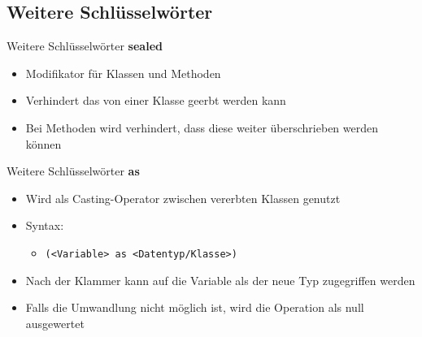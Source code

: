 \subsection{Weitere Schlüsselwörter}
\begin{frame}{Weitere Schlüsselwörter}
	\textbf{sealed}\\
	\begin{itemize}
		\item Modifikator für Klassen und Methoden
		\item Verhindert das von einer Klasse geerbt werden kann
		\item Bei Methoden wird verhindert, dass diese weiter überschrieben werden können
	\end{itemize}
	
\end{frame}

\begin{frame}{Weitere Schlüsselwörter}
	\textbf{as}\\
	\begin{itemize}
		\item Wird als Casting-Operator zwischen vererbten Klassen genutzt
		\item Syntax:
		\begin{itemize}
			\item \texttt{(\alert{<Variable>} as \alert{<Datentyp/Klasse>})}
		\end{itemize}
		\item Nach der Klammer kann auf die Variable als der neue Typ zugegriffen werden
		\item Falls die Umwandlung nicht möglich ist, wird die Operation als \alert{null} ausgewertet
	\end{itemize}	
	
\end{frame}

